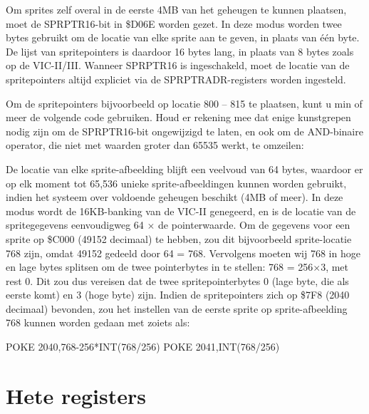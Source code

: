 Om sprites zelf overal in de eerste 4MB van het geheugen te kunnen plaatsen, moet de SPRPTR16-bit in \$D06E worden gezet. In deze modus worden twee bytes gebruikt om de locatie van elke sprite aan te geven, in plaats van één byte. De lijst van spritepointers is daardoor 16 bytes lang, in plaats van 8 bytes zoals op de VIC-II/III. Wanneer SPRPTR16 is ingeschakeld, moet de locatie van de spritepointers altijd expliciet via de SPRPTRADR-registers worden ingesteld.

Om de spritepointers bijvoorbeeld op locatie 800 -- 815 te plaatsen, kunt u min of meer de volgende code gebruiken. Houd er rekening mee dat enige kunstgrepen nodig zijn om de SPRPTR16-bit ongewijzigd te laten, en ook om de AND-binaire operator, die niet met waarden groter dan 65535 werkt, te omzeilen:


De locatie van elke sprite-afbeelding blijft een veelvoud van 64 bytes, waardoor er op elk moment tot 65,536 unieke sprite-afbeeldingen kunnen worden gebruikt, indien het systeem over voldoende geheugen beschikt (4MB of meer). In deze modus wordt de 16KB-banking van de VIC-II genegeerd, en is de locatie van de spritegegevens eenvoudigweg 64 $\times$ de pointerwaarde. Om de gegevens voor een sprite op \$C000 (49152 decimaal) te hebben, zou dit bijvoorbeeld sprite-locatie 768 zijn, omdat 49152 gedeeld door 64 = 768. Vervolgens moeten wij 768 in hoge en lage bytes splitsen om de twee pointerbytes in te stellen: 768 = 256$\times$3, met rest 0. Dit zou dus vereisen dat de twee spritepointerbytes 0 (lage byte, die als eerste komt) en 3 (hoge byte) zijn. Indien de spritepointers zich op \$7F8 (2040 decimaal) bevonden, zou het instellen van de eerste sprite op sprite-afbeelding 768 kunnen worden gedaan met zoiets als:

\begin{screencode}
POKE 2040,768-256*INT(768/256)
POKE 2041,INT(768/256)
\end{screencode}

\section{Hete registers}

